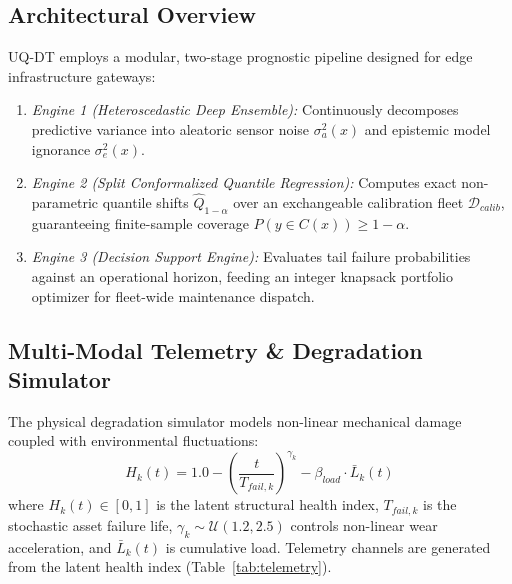 \documentclass[journal,10pt,twocolumn]{article}
\begin{document}
\subsection{Architectural Overview}
UQ-DT employs a modular, two-stage prognostic pipeline designed for edge infrastructure gateways:
\begin{enumerate}
    \item \textit{Engine 1 (Heteroscedastic Deep Ensemble):} Continuously decomposes predictive variance into aleatoric sensor noise $\sigma_a^2(x)$ and epistemic model ignorance $\sigma_e^2(x)$.
    \item \textit{Engine 2 (Split Conformalized Quantile Regression):} Computes exact non-parametric quantile shifts $\hat{Q}_{1-\alpha}$ over an exchangeable calibration fleet $\mathcal{D}_{calib}$, guaranteeing finite-sample coverage $P(y \in C(x)) \ge 1 - \alpha$.
    \item \textit{Engine 3 (Decision Support Engine):} Evaluates tail failure probabilities against an operational horizon, feeding an integer knapsack portfolio optimizer for fleet-wide maintenance dispatch.
\end{enumerate}

\subsection{Multi-Modal Telemetry \& Degradation Simulator}
The physical degradation simulator models non-linear mechanical damage coupled with environmental fluctuations:
\begin{equation}
H_k(t) = 1.0 - \left( \frac{t}{T_{fail, k}} \right)^{\gamma_k} - \beta_{load} \cdot \bar{L}_k(t)
\end{equation}
where $H_k(t) \in [0, 1]$ is the latent structural health index, $T_{fail, k}$ is the stochastic asset failure life, $\gamma_k \sim \mathcal{U}(1.2, 2.5)$ controls non-linear wear acceleration, and $\bar{L}_k(t)$ is cumulative load. Telemetry channels are generated from the latent health index (Table~\ref{tab:telemetry}).
\end{document}
